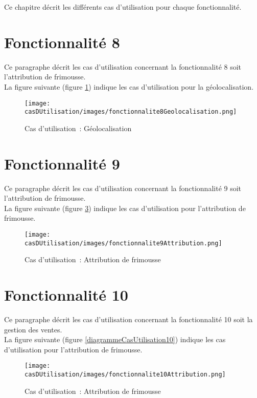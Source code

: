 Ce chapitre décrit les différents cas d'utilisation pour chaque fonctionnalité.


\section{Fonctionnalité 8}
Ce paragraphe décrit les cas d'utilisation concernant la fonctionnalité 8 soit l'attribution de frimousse. \\

La figure suivante (figure \ref{diagrammeCasUtilisation8}) indique les cas d'utilisation pour la géolocalisation.
\begin{figure}[H]
	\centering
	\texttt{[image: casDUtilisation/images/fonctionnalite8Geolocalisation.png]}
	\caption{Cas d'utilisation~: Géolocalisation }
	\label{diagrammeCasUtilisation8}
\end{figure}

\section{Fonctionnalité 9}
Ce paragraphe décrit les cas d'utilisation concernant la fonctionnalité 9 soit l'attribution de frimousse. \\

La figure suivante (figure \ref{diagrammeCasUtilisation9}) indique les cas d'utilisation pour l'attribution de frimousse.
\begin{figure}[H]
	\centering
	\texttt{[image: casDUtilisation/images/fonctionnalite9Attribution.png]}
	\caption{Cas d'utilisation~: Attribution de frimousse }
	\label{diagrammeCasUtilisation9}
\end{figure}

\section{Fonctionnalité 10}
Ce paragraphe décrit les cas d'utilisation concernant la fonctionnalité 10 soit la gestion des ventes. \\

La figure suivante (figure \ref{diagrammeCasUtilisation10}) indique les cas d'utilisation pour l'attribution de frimousse.
\begin{figure}[H]
	\centering
	\texttt{[image: casDUtilisation/images/fonctionnalite10Attribution.png]}
	\caption{Cas d'utilisation~: Attribution de frimousse }
	\label{diagrammeCasUtilisation9}
\end{figure}
